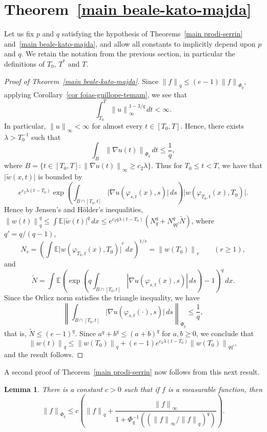 \documentclass[12pt]{amsart}
\newtheorem{lemma}[thm]{Lemma}
\theoremstyle{remark}
\newcommand{\E}{{\mathbb E}}
\newcommand{\modo}[1]{{\left|#1\right|}}
\newcommand{\normo}[1]{{\left\|#1\right\|}}
\newcommand{\smodo}[1]{{\mathopen|#1\mathclose|}}
\newcommand{\snormo}[1]{{\mathopen\|#1\mathclose\|}}
\begin{document}
\section{Theorem~\ref{main beale-kato-majda}}

Let us fix $p$ and $q$ satisfying the hypothesis of 
Theorems~\ref{main prodi-serrin} and~\ref{main beale-kato-majda}, 
and allow all constants to implicitly depend upon $p$ and $q$.
We retain the notation from the previous section, in particular the 
definitions of $T_0$, $T^*$ and $T$.

\begin{proof}[Proof of Theorem~\ref{main beale-kato-majda}]
Since $\snormo f_q \le (e-1)\snormo f_{\Phi_q}$, applying 
Corollary~\ref{cor foias-guillope-temam},
we see that
$$ \int_{T_0}^T \snormo u_\infty^{1-3/q} \, dt < \infty .$$
In particular, $\snormo u_\infty < \infty$ for almost every $t \in [T_0,T]$.
Hence, there exists $\lambda>T_0^{-1}$ such
that
$$ \int_{B}
   \snormo{\nabla u(t)}_{\Phi_q} \, dt \le \frac1q ,$$
where 
$B = \{t \in [T_0,T] \colon \snormo{\nabla u(t)}_\infty \ge c_2 \lambda\}$.
Thus for $T_0 \le t < T$, we have that $\smodo{\tilde w(x,t)}$ is bounded
by
$$ e^{c_2 \lambda (t-T_0)}
   \exp\left(\int_{B\cap[T_0,t]} 
   \smodo{\nabla u(\varphi_{s,t}(x),s)} \, ds\right)
   \smodo{w(\varphi_{T_0,t}(x),T_0)} .$$
Hence by Jensen's and
H\"older's inequalities, $\snormo{w(t)}_{q}^{q} \le 
\int \E\smodo{\tilde w(t)}^{q} \, dx \le 
e^{c_2 q \lambda (t-T_0)}(N_q^q + N_{qq'}^q \tilde N)$, where
$q' = q/(q-1)$, 
$$
   N_r
   =
   \left(\int \E \smodo{w(\varphi_{T_0,t}(x),T_0)}^r\,dx\right)^{1/r} 
   = \snormo{w(T_0)}_r \qquad (r \ge 1), $$
and
$$
   \tilde N
   =
   \int \E \left(
   \exp\left(q\int_{B \cap [T_0,t]}
   \modo{\nabla u(\varphi_{s,t}(x),s)} \, ds \right) - 1 \right)^q
   \, dx .
$$
Since the Orlicz norm satisfies the triangle inequality, we have
$$ \normo{\int_{B\cap[T_0,t]} \smodo{\nabla u(\varphi_{s,t}(\cdot),s)} \, ds}
    _{\Phi_q} \le \frac1q ,$$
that is, $\tilde N \le (e-1)^q $.
Since $a^q + b^q \le (a+b)^q$ for $a,b \ge 0$,
we conclude that 
$$ \snormo{w(t)}_q \le \snormo{w(T_0)}_q + 
   (e-1) e^{c_2 \lambda (t-T_0)} \snormo{w(T_0)}_{qq'} ,$$
and the result follows.
\end{proof}

A second proof of Theorem~\ref{main prodi-serrin} now follows from
this next result.

\begin{lemma}  \label{upper bound for L_Phi}
There is a constant $c>0$ such that if $f$ is a measurable
function, then
$$
  \snormo f_{\Phi_q} \le c
  \left(\snormo f_q + 
  \frac{\snormo f_\infty}{1+\Phi_q^{-1}(({\snormo f_\infty}/{\snormo f_q})^q)}
  \right) .$$
\end{lemma}
\end{document}
